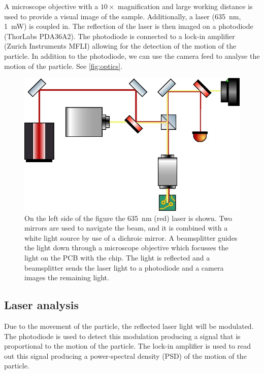 A microscope objective with a $10\times$ magnification and large working distance is used to provide a visual image of the sample. Additionally, a laser (\qty{635}{\nm}, \qty{1}{\milli\watt}) is coupled in. The reflection of the laser is then imaged on a photodiode (ThorLabs PDA36A2). The photodiode is connected to a lock-in amplifier (Zurich Instruments MFLI) allowing for the detection of the motion of the particle. In addition to the photodiode, we can use the camera feed to analyse the motion of the particle. See \autoref{fig:optics}.

\begin{figure}
    \centering
    \includegraphics{figures/optics.jpg}
    \caption{On the left side of the figure the \qty{635}{\nm} (red) laser is shown. Two mirrors are used to navigate the beam, and it is combined with a white light source by use of a dichroic mirror. A beamsplitter guides the light down through a microscope objective which focusses the light on the PCB with the chip. The light is reflected and a beamsplitter sends the laser light to a photodiode and a camera images the remaining light.}
    \label{fig:optics}
\end{figure}

\subsection{Laser analysis}
Due to the movement of the particle, the reflected laser light will be modulated. The photodiode is used to detect this modulation producing a signal that is proportional to the motion of the particle. The lock-in amplifier is used to read out this signal producing a power-spectral density (PSD) of the motion of the particle.

